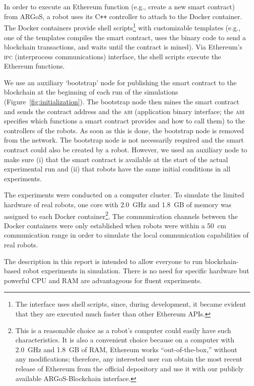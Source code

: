 \documentclass{article}
\begin{document}
In order to execute an Ethereum function (e.g., create a new smart
contract) from ARGoS, a robot uses its C\texttt{++} controller to
attach to the Docker container. The Docker containers provide shell
scripts\footnote{The interface uses shell scripts, since, during
  development, it became evident that they are executed much faster
  than other Ethereum APIs.} with customizable templates (e.g., one of
the templates compiles the smart contract, uses the binary code to
send a blockchain transactions, and waits until the contract is
mined). Via Ethereum's \textsc{ipc} (interprocess communications)
interface, the shell scripts execute the Ethereum functions.

We use an auxiliary `bootstrap' node for publishing the smart contract
to the blockchain at the beginning of each run of the simulations
(Figure~\ref{fig:initialization}). The bootstrap node then mines the
smart contract and sends the contract address and the \textsc{abi}
(application binary interface; the \textsc{abi} specifies which
functions a smart contract provides and how to call them) to the
controllers of the robots. As soon as this is done, the bootstrap node
is removed from the network. The bootstrap node is not necessarily
required and the smart contract could also be created by a
robot. However, we used an auxiliary node to make sure (i) that the
smart contract is available at the start of the actual experimental
run and (ii) that robots have the same initial conditions in all
experiments.

The experiments were conducted on a computer cluster. To simulate the
limited hardware of real robots, one core with 2.0~GHz and 1.8~GB of
memory was assigned to each Docker container\footnote{This is a
  reasonable choice as a robot's computer could easily have such
  characteristics. It is also a convenient choice because on a
  computer with 2.0~GHz and 1.8~GB of RAM, Ethereum works
  ``out-of-the-box,'' without any modifications; therefore, any
  interested user can obtain the most recent release of Ethereum from
  the official depository and use it with our publicly available
  ARGoS-Blockchain interface.}. The communication channels between the
Docker containers were only established when robots were within a
50~cm communication range in order to simulate the local communication
capabilities of real robots.

The description in this report is intended to allow everyone to run
blockchain-based robot experiments in simulation. There is no need for
specific hardware but powerful CPU and RAM are advantageous for fluent
experiments.
\end{document}
